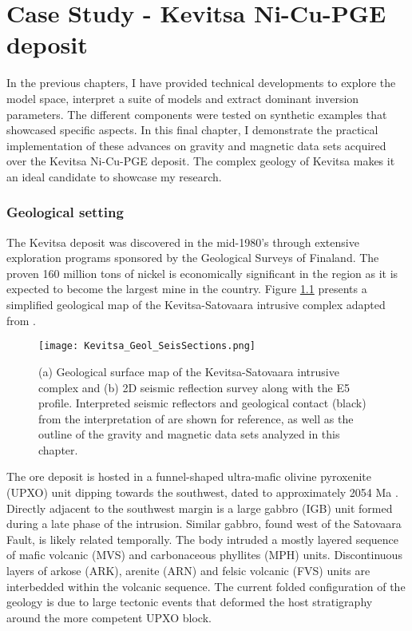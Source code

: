 \graphicspath{{./../Figures/}}
\chapter{Case Study - Kevitsa Ni-Cu-PGE deposit}
\label{Chapter7}

In the previous chapters, I have provided technical developments to explore the model space, interpret a suite of models and extract dominant inversion parameters. The different components were tested on synthetic examples that showcased specific aspects.
In this final chapter, I demonstrate the practical implementation of these advances on gravity and magnetic data sets acquired over the Kevitsa Ni-Cu-PGE deposit.
The complex geology of Kevitsa makes it an ideal candidate to showcase my research.

\subsection{Geological setting}
The Kevitsa deposit was discovered in the mid-1980's through extensive exploration programs sponsored by the Geological Surveys of Finaland. The proven 160 million tons of nickel is economically significant in the region as it is expected to become the largest mine in the country.
Figure \ref{Kevitsa_Geology} presents a simplified geological map of the Kevitsa-Satovaara intrusive complex adapted from \cite{Koivisto2015}.
\begin{figure}[h!]
\texttt{[image: Kevitsa\_Geol\_SeisSections.png]}
\caption{(a) Geological surface map of the Kevitsa-Satovaara intrusive complex and (b) 2D seismic reflection survey along with the E5 profile. Interpreted seismic reflectors and geological contact (black) from the interpretation of \cite{Koivisto2015} are shown for reference, as well as the outline of the gravity and magnetic data sets analyzed in this chapter.}
\label{Kevitsa_Geology}
\end{figure}
The ore deposit is hosted in a funnel-shaped ultra-mafic olivine pyroxenite (UPXO) unit dipping towards the southwest, dated to approximately 2054 Ma \cite[]{Mutanen1997, FQM2011}.
Directly adjacent to the southwest margin is a large gabbro (IGB) unit formed during a late phase of the intrusion. Similar gabbro, found west of the Satovaara Fault, is likely related temporally.
The body intruded a mostly layered sequence of mafic volcanic (MVS) and carbonaceous phyllites (MPH) units. Discontinuous layers of arkose (ARK), arenite (ARN) and felsic volcanic (FVS) units are interbedded within the volcanic sequence.
The current folded configuration of the geology is due to large tectonic events that deformed the host stratigraphy around the more competent UPXO block.

